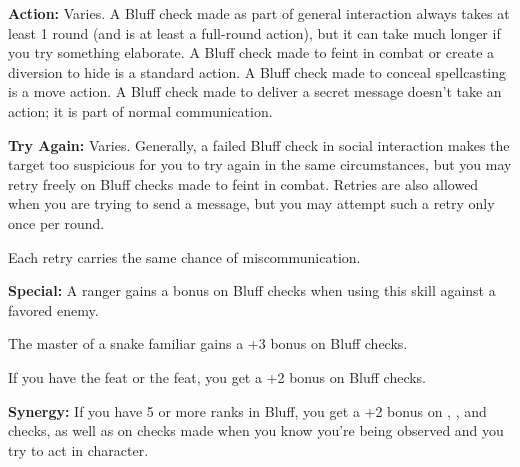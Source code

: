\textbf{Action:} Varies. A Bluff check made as part of general interaction always takes at least 1 round (and is at least a full-round action), but it can take much longer if you try something elaborate. A Bluff check made to feint in combat or create a diversion to hide is a standard action. A Bluff check made to conceal spellcasting is a move action. A Bluff check made to deliver a secret message doesn't take an action; it is part of normal communication.

\textbf{Try Again:} Varies. Generally, a failed Bluff check in social interaction makes the target too suspicious for you to try again in the same circumstances, but you may retry freely on Bluff checks made to feint in combat. Retries are also allowed when you are trying to send a message, but you may attempt such a retry only once per round.

Each retry carries the same chance of miscommunication.

\textbf{Special:} A ranger gains a bonus on Bluff checks when using this skill against a favored enemy.

The master of a snake familiar gains a +3 bonus on Bluff checks.

If you have the  feat or the  feat, you get a +2 bonus on Bluff checks.

\textbf{Synergy:} If you have 5 or more ranks in Bluff, you get a +2 bonus on , , and  checks, as well as on  checks made when you know you're being observed and you try to act in character.

